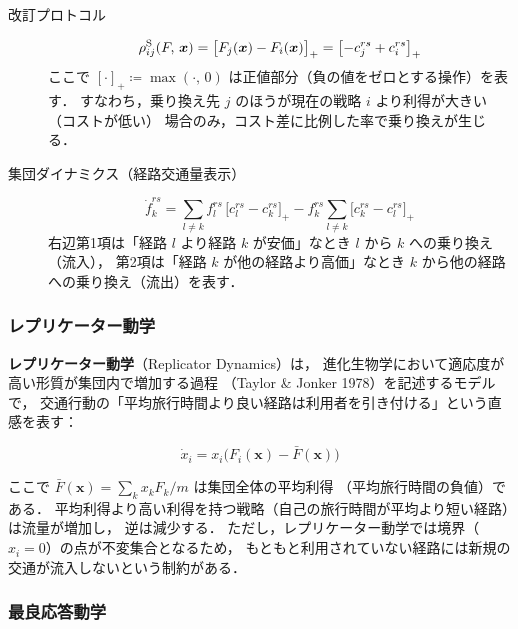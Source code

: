 \begin{description}
  \item[改訂プロトコル]
    \begin{equation}
      \rho_{ij}^{\rm S}(F,\, \boldsymbol{x})
      = \bigl[F_j(\boldsymbol{x}) - F_i(\boldsymbol{x})\bigr]_+
      = \bigl[-c_j^{rs} + c_i^{rs}\bigr]_+
      \label{eq:smith-protocol}
    \end{equation}
    ここで $[\cdot]_+ \coloneqq \max(\cdot,\, 0)$ は正値部分（負の値をゼロとする操作）を表す．
    すなわち，乗り換え先 $j$ のほうが現在の戦略 $i$ より利得が大きい（コストが低い）
    場合のみ，コスト差に比例した率で乗り換えが生じる．

  \item[集団ダイナミクス（経路交通量表示）]
    \begin{equation}
      \dot{f}_k^{rs}
      = \sum_{l \neq k} f_l^{rs}\, \bigl[c_l^{rs} - c_k^{rs}\bigr]_+
        - f_k^{rs} \sum_{l \neq k} \bigl[c_k^{rs} - c_l^{rs}\bigr]_+
      \label{eq:smith-dynamics}
    \end{equation}
    右辺第1項は「経路 $l$ より経路 $k$ が安価」なとき $l$ から $k$ への乗り換え（流入），
    第2項は「経路 $k$ が他の経路より高価」なとき $k$ から他の経路への乗り換え（流出）を表す．
\end{description}

\subsubsection*{レプリケーター動学}

\textbf{レプリケーター動学}（Replicator Dynamics）は，
進化生物学において適応度が高い形質が集団内で増加する過程
（Taylor \& Jonker 1978）\cite{Taylor1978}を記述するモデルで，
交通行動の「平均旅行時間より良い経路は利用者を引き付ける」という直感を表す：

\begin{equation}
  \dot{x}_i
  = x_i \bigl(F_i(\boldsymbol{x}) - \bar{F}(\boldsymbol{x})\bigr)
  \label{eq:replicator}
\end{equation}

ここで $\bar{F}(\boldsymbol{x}) = \sum_k x_k F_k / m$ は集団全体の平均利得
（平均旅行時間の負値）である．
平均利得より高い利得を持つ戦略（自己の旅行時間が平均より短い経路）は流量が増加し，
逆は減少する．
ただし，レプリケーター動学では境界（$x_i = 0$）の点が不変集合となるため，
もともと利用されていない経路には新規の交通が流入しないという制約がある\cite{Sandholm2010}．

\subsubsection*{最良応答動学}

